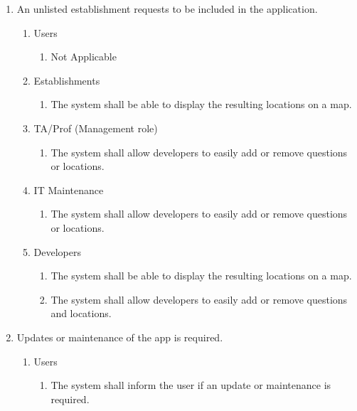\documentclass[titlepage]{article}
\newcounter{req}
\begin{document}
\begin{enumerate}[{BE1}]
			
			\item An unlisted establishment requests to be included in the application.
			\begin{enumerate}[{VP2.1}]
				
				\item Users
				\begin{enumerate}
					\item Not Applicable 
				\end{enumerate}
				
				\item Establishments
				\begin{enumerate}
					\item The system shall be able to display the resulting locations on a map.
				\end{enumerate}
				
				\item TA/Prof (Management role)
				\begin{enumerate}
					\item The system shall allow developers to easily add or remove questions or locations.
				\end{enumerate}
				
				\item IT Maintenance
				\begin{enumerate}
					\item The system shall allow developers to easily add or remove questions or locations.
				\end{enumerate}
				
				\item Developers
				\begin{enumerate}
					\item The system shall be able to display the resulting locations on a map.			
					\item The system shall allow developers to easily add or remove questions and locations.	
					\end{enumerate}
			\end{enumerate}
			
			\item Updates or maintenance of the app is required.
			\begin{enumerate}[{VP3.1}]
				
				\item Users
				\begin{enumerate}
					\item The system shall inform the user if an update or maintenance is required.
				\end{enumerate}
				

\end{enumerate}
\end{enumerate}
\end{document}
